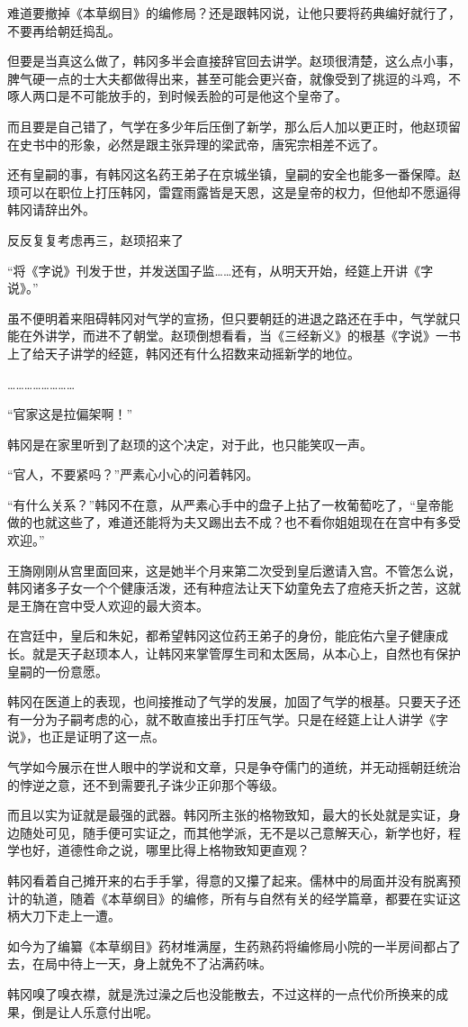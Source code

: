 难道要撤掉《本草纲目》的编修局？还是跟韩冈说，让他只要将药典编好就行了，不要再给朝廷捣乱。

但要是当真这么做了，韩冈多半会直接辞官回去讲学。赵顼很清楚，这么点小事，脾气硬一点的士大夫都做得出来，甚至可能会更兴奋，就像受到了挑逗的斗鸡，不啄人两口是不可能放手的，到时候丢脸的可是他这个皇帝了。

而且要是自己错了，气学在多少年后压倒了新学，那么后人加以更正时，他赵顼留在史书中的形象，必然是跟主张异理的梁武帝，唐宪宗相差不远了。

还有皇嗣的事，有韩冈这名药王弟子在京城坐镇，皇嗣的安全也能多一番保障。赵顼可以在职位上打压韩冈，雷霆雨露皆是天恩，这是皇帝的权力，但他却不愿逼得韩冈请辞出外。

反反复复考虑再三，赵顼招来了

“将《字说》刊发于世，并发送国子监……还有，从明天开始，经筵上开讲《字说》。”

虽不便明着来阻碍韩冈对气学的宣扬，但只要朝廷的进退之路还在手中，气学就只能在外讲学，而进不了朝堂。赵顼倒想看看，当《三经新义》的根基《字说》一书上了给天子讲学的经筵，韩冈还有什么招数来动摇新学的地位。

……………………

“官家这是拉偏架啊！”

韩冈是在家里听到了赵顼的这个决定，对于此，也只能笑叹一声。

“官人，不要紧吗？”严素心小心的问着韩冈。

“有什么关系？”韩冈不在意，从严素心手中的盘子上拈了一枚葡萄吃了，“皇帝能做的也就这些了，难道还能将为夫又踢出去不成？也不看你姐姐现在在宫中有多受欢迎。”

王旖刚刚从宫里面回来，这是她半个月来第二次受到皇后邀请入宫。不管怎么说，韩冈诸多子女一个个健康活泼，还有种痘法让天下幼童免去了痘疮夭折之苦，这就是王旖在宫中受人欢迎的最大资本。

在宫廷中，皇后和朱妃，都希望韩冈这位药王弟子的身份，能庇佑六皇子健康成长。就是天子赵顼本人，让韩冈来掌管厚生司和太医局，从本心上，自然也有保护皇嗣的一份意愿。

韩冈在医道上的表现，也间接推动了气学的发展，加固了气学的根基。只要天子还有一分为子嗣考虑的心，就不敢直接出手打压气学。只是在经筵上让人讲学《字说》，也正是证明了这一点。

气学如今展示在世人眼中的学说和文章，只是争夺儒门的道统，并无动摇朝廷统治的悖逆之意，还不到需要孔子诛少正卯那个等级。

而且以实为证就是最强的武器。韩冈所主张的格物致知，最大的长处就是实证，身边随处可见，随手便可实证之，而其他学派，无不是以己意解天心，新学也好，程学也好，道德性命之说，哪里比得上格物致知更直观？

韩冈看着自己摊开来的右手手掌，得意的又攥了起来。儒林中的局面并没有脱离预计的轨道，随着《本草纲目》的编修，所有与自然有关的经学篇章，都要在实证这柄大刀下走上一遭。

如今为了编纂《本草纲目》药材堆满屋，生药熟药将编修局小院的一半房间都占了去，在局中待上一天，身上就免不了沾满药味。

韩冈嗅了嗅衣襟，就是洗过澡之后也没能散去，不过这样的一点代价所换来的成果，倒是让人乐意付出呢。

